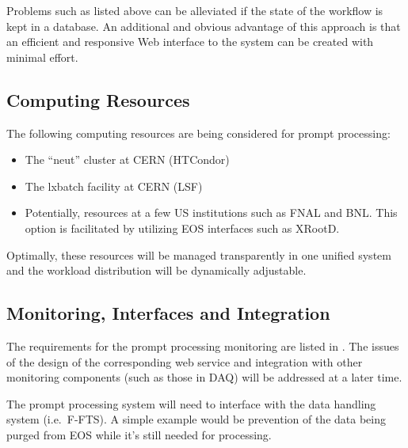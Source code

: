 \documentclass[pdftex,12pt,letter]{article}
\begin{document}
\noindent Problems such as listed above can be alleviated if the state of the workflow is kept in a database.
An additional and obvious advantage of this approach is that an efficient and responsive Web interface to
the system can be created with minimal effort.

\subsection{Computing Resources}
The following computing resources are being considered for prompt processing:
\begin{itemize}
\item The ``neut'' cluster  \cite{neut} at CERN (HTCondor)
\item The lxbatch facility \cite{lxbatch} at CERN (LSF)
\item Potentially, resources at a few US institutions such as FNAL and BNL.  This option is facilitated by utilizing EOS interfaces such as XRootD.
\end{itemize}

\noindent Optimally, these resources will be managed transparently in one unified system and the workload
distribution will be dynamically adjustable.

\subsection{Monitoring, Interfaces and Integration}
The requirements for the prompt processing monitoring are listed in \cite{docdb1811}.
The issues of the design of the corresponding web service and integration with other monitoring
components (such as those in DAQ) will be addressed at a later time.

The prompt processing system will need to interface with the data handling system (i.e.~F-FTS). A simple example
would be prevention of the data being purged from EOS while it's still needed for processing.
\end{document}
